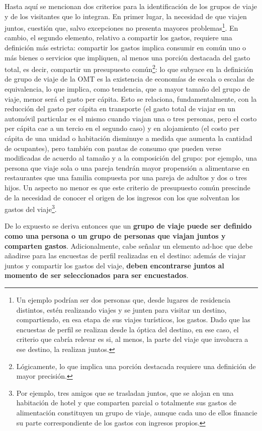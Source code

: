 \documentclass[
]{book}
\begin{document}
Hasta aquí se mencionan dos criterios para la identificación de los grupos de viaje y de los visitantes que lo integran. En primer lugar, la necesidad de que viajen juntos, cuestión que, salvo excepciones no presenta mayores problemas\footnote{Un ejemplo podrían ser dos personas que, desde lugares de residencia distintos, estén realizando viajes y se junten para visitar un destino, compartiendo, en esa etapa de sus viajes turísticos, los gastos. Dado que las encuestas de perfil se realizan desde la óptica del destino, en ese caso, el criterio que cabría relevar es si, al menos, la parte del viaje que involucra a ese destino, la realizan juntos.}. En cambio, el segundo elemento, relativo a compartir los gastos, requiere una definición más estricta: compartir los gastos implica consumir en común uno o más bienes o servicios que impliquen, al menos una porción destacada del gasto total, es decir, compartir un presupuesto común\footnote{Lógicamente, lo que implica una porción destacada requiere una definición de mayor precisión.}: lo que subyace en la definición de grupo de viaje de la OMT es la existencia de economías de escala o escalas de equivalencia, lo que implica, como tendencia, que a mayor tamaño del grupo de viaje, menor será el gasto per cápita. Esto se relaciona, fundamentalmente, con la reducción del gasto per cápita en transporte (el gasto total de viajar en un automóvil particular es el mismo cuando viajan una o tres personas, pero el costo per cápita cae a un tercio en el segundo caso) y en alojamiento (el costo per cápita de una unidad o habitación disminuye a medida que aumenta la cantidad de ocupantes), pero también con pautas de consumo que pueden verse modificadas de acuerdo al tamaño y a la composición del grupo: por ejemplo, una persona que viaje sola o una pareja tendrán mayor propensión a alimentarse en restaurantes que una familia compuesta por una pareja de adultos y dos o tres hijos. Un aspecto no menor es que este criterio de presupuesto común prescinde de la necesidad de conocer el origen de los ingresos con los que solventan los gastos del viaje\footnote{Por ejemplo, tres amigos que se trasladan juntos, que se alojan en una habitación de hotel y que comparten parcial o totalmente sus gastos de alimentación constituyen un grupo de viaje, aunque cada uno de ellos financie su parte correspondiente de los gastos con ingresos propios.}.

De lo expuesto se deriva entonces que un \textbf{grupo de viaje puede ser definido como una persona o un grupo de personas que viajan juntos y comparten gastos}. Adicionalmente, cabe señalar un elemento ad-hoc que debe añadirse para las encuestas de perfil realizadas en el destino: además de viajar juntos y compartir los gastos del viaje, \textbf{deben encontrarse juntos al momento de ser seleccionados para ser encuestados}.
\end{document}
